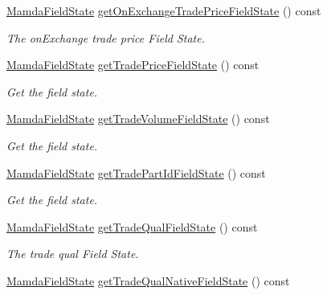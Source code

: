 \begin{CompactItemize}
\hyperlink{namespaceWombat_93aac974f2ab713554fd12a1fa3b7d2a}{Mamda\-Field\-State} \hyperlink{classWombat_1_1MamdaTradeListener_d197007dd685e6240a89ad4729c62352}{get\-On\-Exchange\-Trade\-Price\-Field\-State} () const 
\begin{CompactList}\small\item\em The on\-Exchange trade price Field State. \item\end{CompactList}\item 
\hyperlink{namespaceWombat_93aac974f2ab713554fd12a1fa3b7d2a}{Mamda\-Field\-State} \hyperlink{classWombat_1_1MamdaTradeListener_f1dc31d1863ca41868f8b4a384c7ac46}{get\-Trade\-Price\-Field\-State} () const 
\begin{CompactList}\small\item\em Get the field state. \item\end{CompactList}\item 
\hyperlink{namespaceWombat_93aac974f2ab713554fd12a1fa3b7d2a}{Mamda\-Field\-State} \hyperlink{classWombat_1_1MamdaTradeListener_5fa909b1c87c6380e204dba43ab9baa7}{get\-Trade\-Volume\-Field\-State} () const 
\begin{CompactList}\small\item\em Get the field state. \item\end{CompactList}\item 
\hyperlink{namespaceWombat_93aac974f2ab713554fd12a1fa3b7d2a}{Mamda\-Field\-State} \hyperlink{classWombat_1_1MamdaTradeListener_e386075d2c6a4d5f33d25e820ac81559}{get\-Trade\-Part\-Id\-Field\-State} () const 
\begin{CompactList}\small\item\em Get the field state. \item\end{CompactList}\item 
\hyperlink{namespaceWombat_93aac974f2ab713554fd12a1fa3b7d2a}{Mamda\-Field\-State} \hyperlink{classWombat_1_1MamdaTradeListener_958ea55776c3afa0a572b8819d9c04c8}{get\-Trade\-Qual\-Field\-State} () const 
\begin{CompactList}\small\item\em The trade qual Field State. \item\end{CompactList}\item 
\hyperlink{namespaceWombat_93aac974f2ab713554fd12a1fa3b7d2a}{Mamda\-Field\-State} \hyperlink{classWombat_1_1MamdaTradeListener_2e60dd06819139125a4812e84d5803c0}{get\-Trade\-Qual\-Native\-Field\-State} () const 

\end{CompactItemize}
